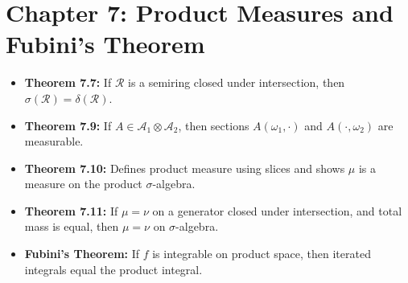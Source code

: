 \documentclass{article}
\begin{document}
\section*{Chapter 7: Product Measures and Fubini's Theorem}
\begin{itemize}
  \item \textbf{Theorem 7.7:} If $\mathcal{R}$ is a semiring closed under intersection, then $\sigma(\mathcal{R}) = \delta(\mathcal{R})$.
  \item \textbf{Theorem 7.9:} If $A \in \mathcal{A}_1 \otimes \mathcal{A}_2$, then sections $A(\omega_1, \cdot)$ and $A(\cdot, \omega_2)$ are measurable.
  \item \textbf{Theorem 7.10:} Defines product measure using slices and shows $\mu$ is a measure on the product $\sigma$-algebra.
  \item \textbf{Theorem 7.11:} If $\mu = \nu$ on a generator closed under intersection, and total mass is equal, then $\mu = \nu$ on $\sigma$-algebra.
  \item \textbf{Fubini’s Theorem:} If $f$ is integrable on product space, then iterated integrals equal the product integral.
\end{itemize}
\end{document}

